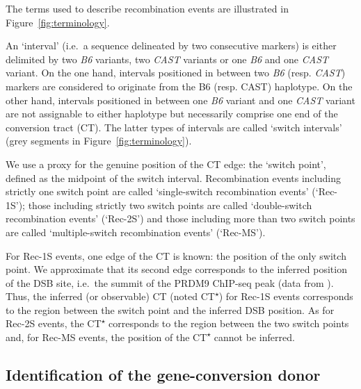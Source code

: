 The terms used to describe recombination events are illustrated in Figure~\ref{fig:terminology}.

An ‘interval’ (i.e.\ a sequence delineated by two consecutive markers) is either delimited by two \textit{B6} variants, two \textit{CAST} variants or one \textit{B6} and one \textit{CAST} variant.
On the one hand, intervals positioned in between two \textit{B6} (resp. \textit{CAST}) markers are considered to originate from the B6 (resp. CAST) haplotype.
On the other hand, intervals positioned in between one \textit{B6} variant and one \textit{CAST} variant are not assignable to either haplotype but necessarily comprise one end of the conversion tract (CT).
The latter types of intervals are called ‘switch intervals’ (grey segments in Figure~\ref{fig:terminology}).

We use a proxy for the genuine position of the CT edge: the ‘switch point’, defined as the midpoint of the switch interval.
Recombination events including strictly one switch point are called ‘single-switch recombination events’ (‘Rec-1S’); those including strictly two switch points are called ‘double-switch recombination events’ (‘Rec-2S’) and those including more than two switch points are called ‘multiple-switch recombination events’ (‘Rec-MS’).

For Rec-1S events, one edge of the CT is known: the position of the only switch point.
We approximate that its second edge corresponds to the inferred position of the DSB site, i.e.\ the summit of the PRDM9 ChIP-seq peak (data from \citealp{baker2015prdm9}).
Thus, the inferred (or observable) CT (noted CT\textsuperscript{$\star$}) for Rec-1S events corresponds to the region between the switch point and the inferred DSB position.
As for Rec-2S events, the CT\textsuperscript{$\star$} corresponds to the region between the two switch points and, for Rec-MS events, the position of the CT\textsuperscript{$\star$} cannot be inferred.






\subsection{Identification of the gene-conversion donor}

